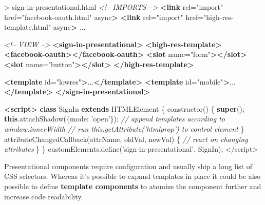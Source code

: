 \documentclass[]{article}
\newenvironment{Shaded}{}{}
\newcommand{\KeywordTok}[1]{\textcolor[rgb]{0.00,0.44,0.13}{\textbf{{#1}}}}
\newcommand{\DataTypeTok}[1]{\textcolor[rgb]{0.56,0.13,0.00}{{#1}}}
\newcommand{\StringTok}[1]{\textcolor[rgb]{0.25,0.44,0.63}{{#1}}}
\newcommand{\SpecialStringTok}[1]{\textcolor[rgb]{0.73,0.40,0.53}{{#1}}}
\newcommand{\CommentTok}[1]{\textcolor[rgb]{0.38,0.63,0.69}{\textit{{#1}}}}
\newcommand{\OtherTok}[1]{\textcolor[rgb]{0.00,0.44,0.13}{{#1}}}
\newcommand{\VariableTok}[1]{\textcolor[rgb]{0.10,0.09,0.49}{{#1}}}
\newcommand{\OperatorTok}[1]{\textcolor[rgb]{0.40,0.40,0.40}{{#1}}}
\newcommand{\AttributeTok}[1]{\textcolor[rgb]{0.49,0.56,0.16}{{#1}}}
\newcommand{\NormalTok}[1]{{#1}}
\begin{document}
\begin{Shaded}
\begin{Highlighting}[]
\NormalTok{> sign-in-presentational.html}
\CommentTok{<!-- IMPORTS -->}
\KeywordTok{<link}\OtherTok{ rel=}\StringTok{"import"}\OtherTok{ href=}\StringTok{"facebook-oauth.html"}\OtherTok{ async}\KeywordTok{>}
\KeywordTok{<link}\OtherTok{ rel=}\StringTok{"import"}\OtherTok{ href=}\StringTok{"high-res-template.html"}\OtherTok{ async}\KeywordTok{>}
\NormalTok{...}

\CommentTok{<!-- VIEW -->}
\KeywordTok{<sign-in-presentational>}
  \KeywordTok{<high-res-template>}
    \KeywordTok{<facebook-oauth></facebook-oauth>}
    \KeywordTok{<slot}\OtherTok{ name=}\StringTok{"form"}\KeywordTok{></slot>}
    \KeywordTok{<slot}\OtherTok{ name=}\StringTok{"button"}\KeywordTok{></slot>}
  \KeywordTok{</high-res-template>}
  
  \KeywordTok{<template}\OtherTok{ id=}\StringTok{"lowres"}\KeywordTok{>}\NormalTok{...}\KeywordTok{</template>}
  \KeywordTok{<template}\OtherTok{ id=}\StringTok{"mobile"}\KeywordTok{>}\NormalTok{...}\KeywordTok{</template>}
\KeywordTok{</sign-in-presentational>}

\KeywordTok{<script>}
  \KeywordTok{class} \NormalTok{SignIn }\KeywordTok{extends} \NormalTok{HTMLElement }\OperatorTok{\{}
    \AttributeTok{constructor}\NormalTok{() }\OperatorTok{\{}
      \KeywordTok{super}\NormalTok{()}\OperatorTok{;}
      \KeywordTok{this}\NormalTok{.}\AttributeTok{attachShadow}\NormalTok{(}\OperatorTok{\{}\DataTypeTok{mode}\OperatorTok{:} \StringTok{'open'}\OperatorTok{\}}\NormalTok{)}\OperatorTok{;}
      \CommentTok{// append templates according to window.innerWidth}
      \CommentTok{// run this.getAttribute('htmlprop') to control element}
    \OperatorTok{\}}
    \AttributeTok{attributeChangedCallback}\NormalTok{(attrName}\OperatorTok{,} \NormalTok{oldVal}\OperatorTok{,} \NormalTok{newVal) }\OperatorTok{\{}
      \CommentTok{// react on changing attributes}
    \OperatorTok{\}}
  \OperatorTok{\}}
  \VariableTok{customElements}\NormalTok{.}\AttributeTok{define}\NormalTok{(}\StringTok{'sign-in-presentational'}\OperatorTok{,} \NormalTok{SignIn)}\OperatorTok{;}
\OperatorTok{<}\SpecialStringTok{/script>}
\end{Highlighting}
\end{Shaded}

Presentational components require configuration and usually ship a long
list of CSS selectors. Whereas it's possible to expand templates in
place it could be also possible to define \textbf{template components}
to atomize the component further and increase code readability.
\end{document}
